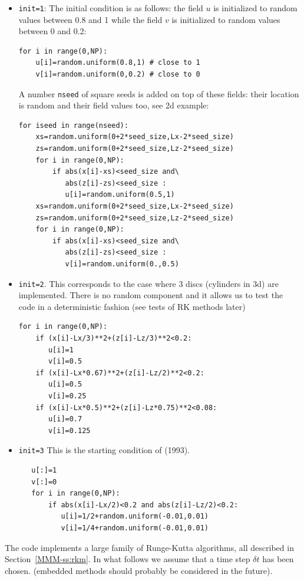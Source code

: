 \begin{itemize}
\item \lstinline{init=1}:
The initial condition is as follows: the field $u$ is initialized
to random values between 0.8 and 1 while the field $v$ is 
initialized to random values between 0 and 0.2:
\begin{lstlisting}
for i in range(0,NP):
    u[i]=random.uniform(0.8,1) # close to 1
    v[i]=random.uniform(0,0.2) # close to 0 
\end{lstlisting}
A number \lstinline{nseed} of square seeds is added on top
of these fields: their location is random and their field values too,
see 2d example:
\begin{lstlisting}
for iseed in range(nseed):
    xs=random.uniform(0+2*seed_size,Lx-2*seed_size)
    zs=random.uniform(0+2*seed_size,Lz-2*seed_size)
    for i in range(0,NP):
        if abs(x[i]-xs)<seed_size and\
           abs(z[i]-zs)<seed_size :
           u[i]=random.uniform(0.5,1)
    xs=random.uniform(0+2*seed_size,Lx-2*seed_size)
    zs=random.uniform(0+2*seed_size,Lz-2*seed_size)
    for i in range(0,NP):
        if abs(x[i]-xs)<seed_size and\
           abs(z[i]-zs)<seed_size :
           v[i]=random.uniform(0.,0.5)
\end{lstlisting}

\item \lstinline{init=2}.
This corresponds to the case where 3 discs (cylinders in 3d)
are implemented. There is no random component and it allows 
us to test the code in a deterministic fashion (see 
tests of RK methods later)
\begin{lstlisting}
for i in range(0,NP):
    if (x[i]-Lx/3)**2+(z[i]-Lz/3)**2<0.2:
       u[i]=1
       v[i]=0.5
    if (x[i]-Lx*0.67)**2+(z[i]-Lz/2)**2<0.2:
       u[i]=0.5
       v[i]=0.25
    if (x[i]-Lx*0.5)**2+(z[i]-Lz*0.75)**2<0.08:
       u[i]=0.7
       v[i]=0.125
\end{lstlisting}

\item \lstinline{init=3}
This is the starting condition of \textcite{pear93} (1993).
\begin{lstlisting}
   u[:]=1
   v[:]=0
   for i in range(0,NP):
       if abs(x[i]-Lx/2)<0.2 and abs(z[i]-Lz/2)<0.2:
          u[i]=1/2+random.uniform(-0.01,0.01)
          v[i]=1/4+random.uniform(-0.01,0.01)
\end{lstlisting}


\end{itemize}

The code implements a large family of Runge-Kutta algorithms, all described in 
Section~\ref{MMM-ss:rkm}.
In what follows we assume that a time step $\delta t$ has been chosen. 
(embedded methods should probably be considered in the future).

